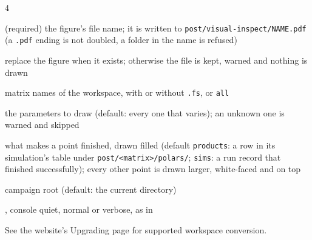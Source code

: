 \begin{multicols}{4}

\begin{flags}
\item {} (required) the figure's file name; it is written to \texttt{post/visual-inspect/NAME.pdf} (a \texttt{.pdf} ending is not doubled, a folder in the name is refused)
\item {} replace the figure when it exists; otherwise the file is kept, warned and nothing is drawn
\item {} matrix names of the workspace, with or without \texttt{.fs}, or \texttt{all}
\item {} the parameters to draw (default: every one that varies); an unknown one is warned and skipped
\item {} what makes a point finished, drawn filled (default \texttt{products}: a row in its simulation's table under \texttt{post/<matrix>/polars/}; \texttt{sims}: a run record that finished successfully); every other point is drawn larger, white-faced and on top
\item {} campaign root (default: the current directory)
\item {},  console quiet, normal or verbose, as in 
\end{flags}
See the website's Upgrading page for supported workspace conversion.


\end{multicols}
